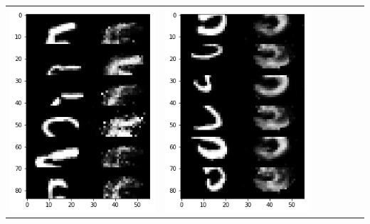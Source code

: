 \documentclass[12pt]{report} %
\begin{document}
\begin{tabular}{m{0.7cm}m{2.4cm}m{2.4cm}m{2.4cm}m{2.4cm}m{2.4cm}m{2.4cm}}
\includegraphics[scale=0.3]{pictures/M1_5_up.png} & \includegraphics[scale=0.3]{pictures/M1_5_down.png} &

\end{tabular}
\end{document}
